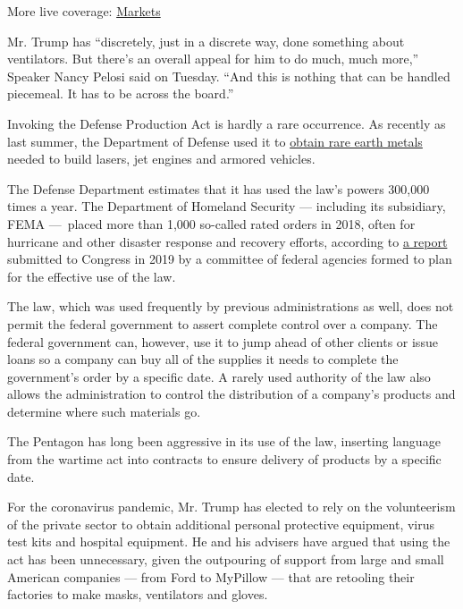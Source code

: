 More live coverage:
\href{https://www.nytimes3xbfgragh.onion/live/2020/08/03/business/stock-market-today-coronavirus?action=click\&pgtype=Article\&state=default\&region=MAIN_CONTENT_1\&context=storylines_live_updates}{Markets}

Mr. Trump has ``discretely, just in a discrete way, done something about
ventilators. But there's an overall appeal for him to do much, much
more,'' Speaker Nancy Pelosi said on Tuesday. ``And this is nothing that
can be handled piecemeal. It has to be across the board.''

Invoking the Defense Production Act is hardly a rare occurrence. As
recently as last summer, the Department of Defense used it to
\href{https://www.businessdefense.gov/News/News-Display/Article/1913110/defense-production-act-title-iii-presidential-determinations-to-strengthen-the/}{obtain
rare earth metals} needed to build lasers, jet engines and armored
vehicles.

The Defense Department estimates that it has used the law's powers
300,000 times a year. The Department of Homeland Security --- including
its subsidiary, FEMA ---~placed more than 1,000 so-called rated orders
in 2018, often for hurricane and other disaster response and recovery
efforts, according to
\href{https://www.fema.gov/media-library-data/1582898704576-dc44bbe61cce3cf763cc8a6b92617188/2018_DPAC_Report_to_Congress.pdf}{a
report} submitted to Congress in 2019 by a committee of federal agencies
formed to plan for the effective use of the law.

The law, which was used frequently by previous administrations as well,
does not permit the federal government to assert complete control over a
company. The federal government can, however, use it to jump ahead of
other clients or issue loans so a company can buy all of the supplies it
needs to complete the government's order by a specific date. A rarely
used authority of the law also allows the administration to control the
distribution of a company's products and determine where such materials
go.

The Pentagon has long been aggressive in its use of the law, inserting
language from the wartime act into contracts to ensure delivery of
products by a specific date.

For the coronavirus pandemic, Mr. Trump has elected to rely on the
volunteerism of the private sector to obtain additional personal
protective equipment, virus test kits and hospital equipment. He and his
advisers have argued that using the act has been unnecessary, given the
outpouring of support from large and small American companies --- from
Ford to MyPillow --- that are retooling their factories to make masks,
ventilators and gloves.

